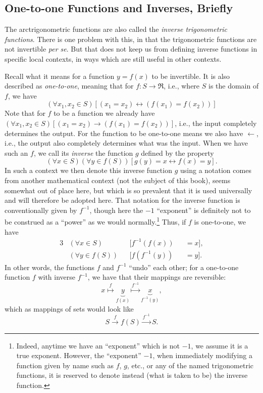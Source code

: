 \subsection{One-to-one Functions and Inverses, Briefly}

The arctrigonometric functions are also called the 
{\it inverse trigonometric functions}.  There is one
problem with this, in that the trigonometric functions
are not invertible {\it per se}.  But that does not
keep us from defining  inverse functions in specific
local contexts, in ways which are still useful in other contexts.


Recall what it means for a function $y=f(x)$ to be invertible.
It is also described as {\it one-to-one}, meaning that
for $f:S\longrightarrow \Re$, i.e., where $S$ is the domain of $f$,
we have
\begin{equation}
\left(\forall x_1,x_2\in S\right)\left[\left(x_1=x_2\right)
\longleftrightarrow\left(f\left(x_1\right)=
                      f\left(x_2\right)\right)\right]
                \label{One-To-OneDefArcTrigSection}
\end{equation}
Note that for $f$ to be a function we already
have $\left(\forall x_1,x_2\in S\right)
\left[\left(x_1=x_2\right)\longrightarrow
\left( f\left(x_1\right)=f\left(x_2\right)\right)\right]$,
i.e., the input completely determines the output.
For the function to be one-to-one means we also have $\longleftarrow$,
i.e., the output also completely determines what was the input.
When we have such an $f$, we call its {\it inverse} the function
$g$ defined by the property
\begin{equation}
(\forall x\in S)(\forall y\in f(S))[g(y)=x\longleftrightarrow f(x)=y].
\label{DefOfInverseFunctionInGeneral}\end{equation}
In such a context
we then denote this inverse function $g$ using a notation 
comes from another mathematical context (not the subject of
this book), seems somewhat out of place here,
but which is so prevalent that it is used universally and will
therefore be adopted here.
That notation for the inverse function is conventionally given by
$f^{-1}$, though here the $-1$ ``exponent'' is definitely not to be construed
as a ``power'' as we would normally.\footnote{%
Indeed, anytime we have an ``exponent'' which is not $-1$, we
assume it is a true exponent.  However, the ``exponent''
$-1$, when immediately modifying a function given by
name such as $f$, $g$, etc., or any of
the named trigonometric functions, it is reserved to denote
instead (what is taken to be) the inverse function.
} Thus, if $f$ is one-to-one, we have
\begin{alignat}{3}
&(\forall x\in S)&&[f^{-1}(f(x))&&=x],\label{InversesProp1}\\
&(\forall y\in f(S))&&[f(f^{-1}(y))&&=y].\label{InversesProp2}\end{alignat}
In other words, the functions $f$ and $f^{-1}$ ``undo'' each other;
for a one-to-one function $f$ with inverse $f^{-1}$, we have
that their  mappings are reversible:
$$x\overset{f}{\longmapsto}\underbrace{y}_{f(x)}
\overset{f^{-1}}{\longmapsto}\underbrace{x}_{f^{-1}(y)},$$
which as mappings of sets would look like
$$S\overset{f}{\longrightarrow}f(S)\overset{f^{-1}}{\longrightarrow}S.$$

